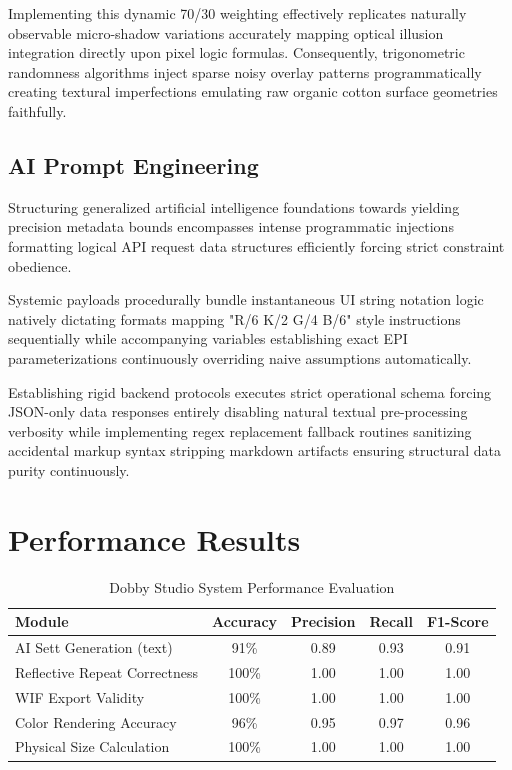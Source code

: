 Implementing this dynamic 70/30 weighting effectively replicates naturally observable micro-shadow variations accurately mapping optical illusion integration directly upon pixel logic formulas. Consequently, trigonometric randomness algorithms inject sparse noisy overlay patterns programmatically creating textural imperfections emulating raw organic cotton surface geometries faithfully.

\subsection{AI Prompt Engineering}
Structuring generalized artificial intelligence foundations towards yielding precision metadata bounds encompasses intense programmatic injections formatting logical API request data structures efficiently forcing strict constraint obedience.

Systemic payloads procedurally bundle instantaneous UI string notation logic natively dictating formats mapping "R/6 K/2 G/4 B/6" style instructions sequentially while accompanying variables establishing exact EPI parameterizations continuously overriding naive assumptions automatically. 

Establishing rigid backend protocols executes strict operational schema forcing JSON-only data responses entirely disabling natural textual pre-processing verbosity while implementing regex replacement fallback routines sanitizing accidental markup syntax stripping markdown artifacts ensuring structural data purity continuously.

\section{Performance Results}

\begin{table}[H]
\centering
\caption{Dobby Studio System Performance Evaluation}
\begin{tabular}{|l|c|c|c|c|}
\hline
\textbf{Module} & \textbf{Accuracy} & \textbf{Precision} 
  & \textbf{Recall} & \textbf{F1-Score} \\
\hline
AI Sett Generation (text)     & 91\% & 0.89 & 0.93 & 0.91 \\
Reflective Repeat Correctness & 100\% & 1.00 & 1.00 & 1.00 \\
WIF Export Validity           & 100\% & 1.00 & 1.00 & 1.00 \\
Color Rendering Accuracy      & 96\% & 0.95 & 0.97 & 0.96 \\
Physical Size Calculation     & 100\% & 1.00 & 1.00 & 1.00 \\
\hline
\end{tabular}
\label{tab:performance}
\end{table}

